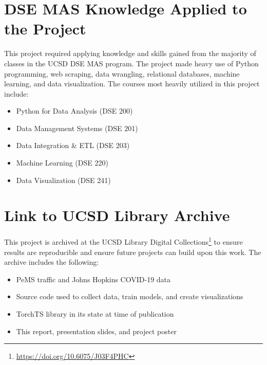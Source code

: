 \documentclass{article}
\begin{document}



\begin{appendices}

\section{DSE MAS Knowledge Applied to the Project}

This project required applying knowledge and skills gained from the majority of classes in the UCSD DSE MAS program. The project made heavy use of Python programming, web scraping, data wrangling, relational databases, machine learning, and data visualization. The courses most heavily utilized in this project include:

\begin{itemize}
    \item Python for Data Analysis (DSE 200)
    \item Data Management Systems (DSE 201)
    \item Data Integration \& ETL (DSE 203)
	\item Machine Learning (DSE 220)
	\item Data Visualization (DSE 241)
\end{itemize}

\section{Link to UCSD Library Archive}

This project is archived at the UCSD Library Digital Collections\footnote{\url{https://doi.org/10.6075/J03F4PHC}} to ensure results are reproducible and ensure future projects can build upon this work. The archive includes the following:

\begin{itemize}
    \item PeMS traffic and Johns Hopkins COVID-19 data
    \item Source code used to collect data, train models, and create visualizations
    \item TorchTS library in its state at time of publication
    \item This report, presentation slides, and project poster
\end{itemize}

\end{appendices}
\end{document}
